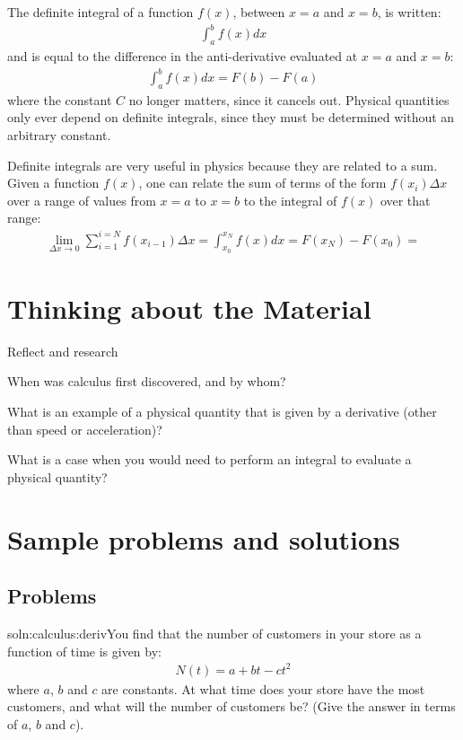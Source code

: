 \begin{chapterSummary}
The definite integral of a function $f(x)$, between $x=a$ and $x=b$, is written:
\begin{align*}
\int_a^b f(x) dx
\end{align*}
and is equal to the difference in the anti-derivative evaluated at $x=a$ and $x=b$:
\begin{align*}
\int_a^b f(x) dx = F(b) - F(a)
\end{align*}
where the constant $C$ no longer matters, since it cancels out. Physical quantities only ever depend on definite integrals, since they must be determined without an arbitrary constant. 

Definite integrals are very useful in physics because they are related to a sum. Given a function $f(x)$, one can relate the sum of terms of the form $f(x_i)\Delta x$ over a range of values from $x=a$ to $x=b$ to the integral of $f(x)$ over that range:
\begin{align*}
\lim_{\Delta x\to 0}\sum_{i=1}^{i=N} f(x_{i-1}) \Delta x = \int_{x_0}^{x_N}f(x) dx=F(x_N) - F(x_0)=
\end{align*}
\end{chapterSummary}

\section{Thinking about the Material}
\begin{chapteractivity}{Reflect and research}
{
\item When was calculus first discovered, and by whom?
\item What is an example of a physical quantity that is given by a derivative (other than speed or acceleration)?
\item What is a case when you would need to perform an integral to evaluate a physical quantity?
}
\end{chapteractivity}

\section{Sample problems and solutions}
\subsection{Problems} 
\begin{problem}{soln:calculus:deriv}{\label{prob:calculus:deriv}You find that the number of customers in your store as a function of time is given by:
\begin{align*}
N(t) = a+bt-ct^2
\end{align*}
where $a$, $b$ and $c$ are constants. At what time does your store have the most customers, and what will the number of customers be? (Give the answer in terms of $a$, $b$ and $c$).}
\end{problem}

